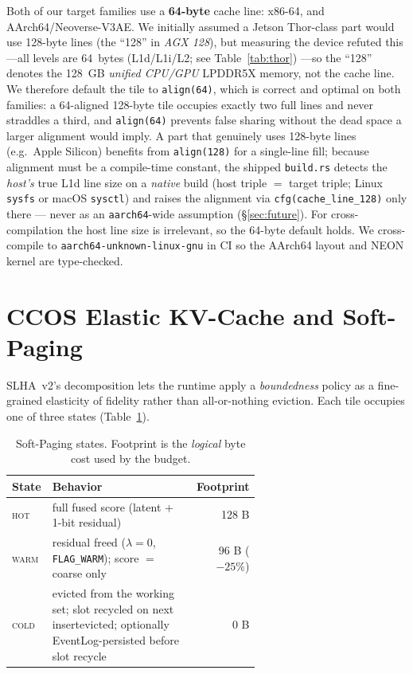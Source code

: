 \documentclass[11pt]{article}
\newcommand{\added}[1]{\textcolor{revisionblue}{#1}}
\newcommand{\deleted}[1]{\textcolor{revisionred}{#1}}
\theoremstyle{plain}
\theoremstyle{definition}
\begin{document}
Both of our target families use a \textbf{64-byte} cache line: x86-64, and
AArch64/Neoverse-V3AE. We initially assumed a Jetson Thor-class part would
use 128-byte lines (the ``128'' in \emph{AGX 128}), but measuring the device
refuted this---all levels are 64~bytes (L1d/L1i/L2; see Table~\ref{tab:thor})
---so the ``128'' denotes the 128~GB \emph{unified CPU/GPU} LPDDR5X memory,
not the cache line.
We therefore default the tile to \texttt{align(64)}, which is correct and
optimal on both families: a 64-aligned 128-byte tile occupies exactly two full
lines and never straddles a third, and \texttt{align(64)} prevents false
sharing without the dead space a larger alignment would imply. A part that
genuinely uses 128-byte lines (e.g.\ Apple Silicon) benefits from
\texttt{align(128)} for a single-line fill; because alignment must be a
compile-time constant, the shipped \texttt{build.rs} detects the \emph{host's}
true L1d line size on a \emph{native} build (host triple $=$ target triple;
Linux \texttt{sysfs} or macOS \texttt{sysctl}) and raises the alignment via
\texttt{cfg(cache\_line\_128)} only there --- never as an \texttt{aarch64}-wide
assumption (\S\ref{sec:future}). For cross-compilation the host line size is
irrelevant, so the 64-byte default holds. We cross-compile to
\texttt{aarch64-unknown-linux-gnu} in CI so the AArch64 layout and NEON kernel
are type-checked.

\section{CCOS Elastic KV-Cache and Soft-Paging}
\label{sec:ccos}

SLHA~v2's decomposition lets the runtime apply a \emph{boundedness}
policy as a fine-grained elasticity of fidelity rather than all-or-nothing
eviction. Each tile occupies one of three states
(Table~\ref{tab:states}).

\begin{table}[t]
\centering
\caption{Soft-Paging states. Footprint is the \emph{logical} byte cost
used by the budget.}
\label{tab:states}
\small
\begin{tabular}{@{}l>{\raggedright\arraybackslash}p{0.62\linewidth}r@{}}
\toprule
State & Behavior & Footprint \\
\midrule
\textsc{hot}  & full fused score (latent + 1-bit residual) & 128 B \\
\textsc{warm} & residual freed ($\lambda=0$, \texttt{FLAG\_WARM}); score $=$ coarse only & 96 B ($-25\%$) \\
\textsc{cold} & \deleted{evicted from the working set; slot recycled on next insert}\added{evicted; optionally EventLog-persisted before slot recycle} & 0 B \\
\bottomrule
\end{tabular}
\end{table}
\end{document}
